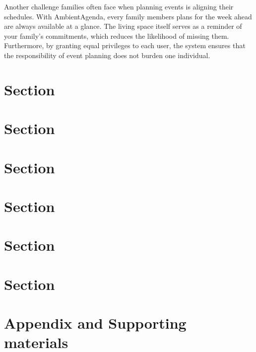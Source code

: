 \documentclass[11pt, a4, oneside]{article}
\begin{document}
\noindent Another challenge families often face when planning events is aligning their schedules. With AmbientAgenda, every family members plans for the week ahead are always available at a glance. The living space itself serves as a reminder of your family's commitments, which reduces the likelihood of missing them. Furthermore, by granting equal privileges to each user, the system ensures that the responsibility of event planning does not burden one individual.\par

\section{Section}
\section{Section}
\section{Section}
\section{Section}
\section{Section}
\section{Section}



\section{Appendix and Supporting materials}

\end{document}
